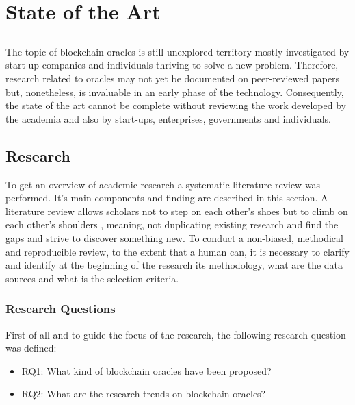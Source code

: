 \chapter{State of the Art} \label{chap:sota}

\section*{}



The topic of blockchain oracles is still unexplored territory mostly investigated by start-up companies and individuals thriving to solve a new problem. Therefore, research related to oracles may not yet be documented on peer-reviewed papers but, nonetheless, is invaluable in an early phase of the technology. Consequently, the state of the art cannot be complete without reviewing the work developed by the academia and also by start-ups, enterprises, governments and individuals. 

\section{Research}
 
To get an overview of academic research a systematic literature review was performed. It's main components and finding are described in this section. 
A literature review allows scholars not to step on each other's shoes but to climb on each other's shoulders \cite{Kitchenham2007GuidelinesEngineering}, meaning, not duplicating existing research and find the gaps and strive to discover something new. To conduct a non-biased, methodical and reproducible review, to the extent that a human can, it is necessary to clarify and identify at the beginning of the research its methodology, what are the data sources and what is the selection criteria.   

\subsection{Research Questions}
First of all and to guide the focus of the research, the following research question was defined:
\begin{itemize}
\item RQ1: What kind of blockchain oracles have been proposed?
\item RQ2: What are the research trends on blockchain oracles?
\end{itemize}


